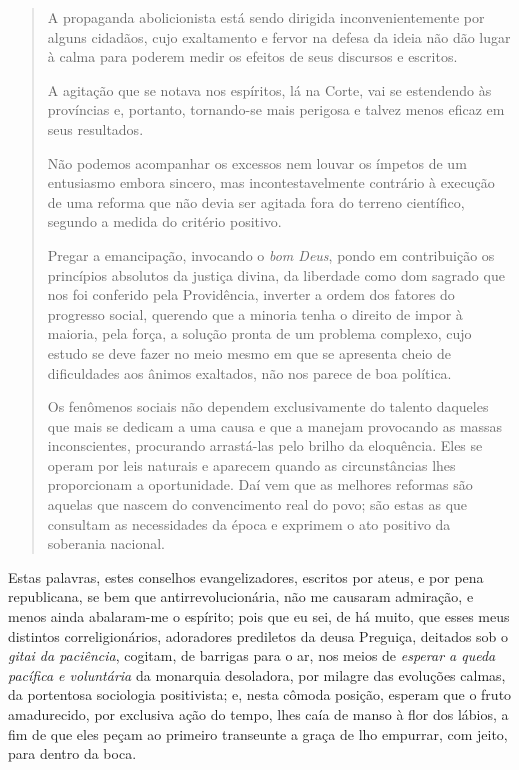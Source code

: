 \begin{quote}
A propaganda abolicionista está sendo dirigida inconvenientemente por
alguns cidadãos, cujo exaltamento e fervor na defesa da ideia não dão
lugar à calma para poderem medir os efeitos de seus discursos e
escritos.

A agitação que se notava nos espíritos, lá na Corte, vai se estendendo
às províncias e, portanto, tornando-se mais perigosa e talvez menos
eficaz em seus resultados.

Não podemos acompanhar os excessos nem louvar os ímpetos de um
entusiasmo embora sincero, mas incontestavelmente contrário à execução
de uma reforma que não devia ser agitada fora do terreno científico,
segundo a medida do critério positivo.

Pregar a emancipação, invocando o \emph{bom Deus}, pondo em contribuição
os princípios absolutos da justiça divina, da liberdade como dom sagrado
que nos foi conferido pela Providência, inverter a ordem dos fatores do
progresso social, querendo que a minoria tenha o direito de impor à
maioria, pela força, a solução pronta de um problema complexo, cujo
estudo se deve fazer no meio mesmo em que se apresenta cheio de
dificuldades aos ânimos exaltados, não nos parece de boa política.

Os fenômenos sociais não dependem exclusivamente do talento daqueles que
mais se dedicam a uma causa e que a manejam provocando as massas
inconscientes, procurando arrastá-las pelo brilho da eloquência. Eles se
operam por leis naturais e aparecem quando as circunstâncias lhes
proporcionam a oportunidade. Daí vem que as melhores reformas são
aquelas que nascem do convencimento real do povo; são estas as que
consultam as necessidades da época e exprimem o ato positivo da
soberania nacional.
\end{quote}

\noindent\dotfill{}

Estas palavras, estes conselhos evangelizadores, escritos por ateus, e
por pena republicana, se bem que antirrevolucionária, não me causaram
admiração, e menos ainda abalaram-me o espírito; pois que eu sei, de há
muito, que esses meus distintos correligionários, adoradores prediletos
da deusa Preguiça, deitados sob o \emph{gitai da paciência}, cogitam, de
barrigas para o ar, nos meios de \emph{esperar a queda pacífica e
voluntária} da monarquia desoladora, por milagre das evoluções calmas,
da portentosa sociologia positivista; e, nesta cômoda posição, esperam
que o fruto amadurecido, por exclusiva ação do tempo, lhes caía de manso
à flor dos lábios, a fim de que eles peçam ao primeiro transeunte a
graça de lho empurrar, com jeito, para dentro da boca.

